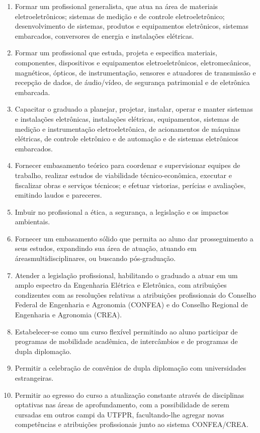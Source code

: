 \begin{enumerate}
	\item	Formar um profissional generalista, que atua na área de materiais eletroeletrônicos; sistemas de medição e de controle eletroeletrônico; desenvolvimento de sistemas, produtos e equipamentos eletrônicos, sistemas embarcados, conversores de energia e instalações elétricas.
	\item	Formar um profissional que estuda, projeta e especifica materiais, componentes, dispositivos e equipamentos eletroeletrônicos, eletromecânicos, magnéticos, ópticos, de instrumentação, sensores e atuadores de transmissão e recepção de dados, de áudio/vídeo, de segurança patrimonial e de eletrônica embarcada.
	\item	Capacitar o graduado a planejar, projetar, instalar, operar e manter sistemas e instalações eletrônicas, instalações elétricas, equipamentos, sistemas de medição e instrumentação eletroeletrônica, de acionamentos de máquinas elétricas, de controle eletrônico e de automação e de sistemas eletrônicos embarcados.
	\item	Fornecer embasamento teórico para coordenar e supervisionar equipes de trabalho, realizar estudos de viabilidade técnico-econômica, executar e fiscalizar obras e serviços técnicos; e efetuar vistorias, perícias e avaliações, emitindo laudos e pareceres.
	\item	Imbuir no profissional a ética, a segurança, a legislação e os impactos ambientais.
	\item	Fornecer um embasamento sólido que permita ao aluno dar prosseguimento a seus estudos, expandindo sua área de atuação, atuando em áreasmultidisciplinares, ou buscando pós-graduação.
	\item	Atender a legislação profissional, habilitando o graduado a atuar em um amplo espectro da Engenharia Elétrica e Eletrônica, com atribuições condizentes com as resoluções relativas a atribuições profissionais do Conselho Federal de Engenharia e Agronomia (CONFEA) e do Conselho Regional de Engenharia e Agronomia (CREA).
	\item	Estabelecer-se como um curso flexível permitindo ao aluno participar de programas de mobilidade acadêmica, de intercâmbios e de programas de dupla diplomação.
	\item	Permitir a celebração de convênios de dupla diplomação com universidades estrangeiras.
	\item	Permitir ao egresso do curso a atualização constante através de disciplinas optativas nas áreas de aprofundamento, com a possibilidade de serem cursadas em outros campi da UTFPR, facultando-lhe agregar novas competências e atribuições profissionais junto ao sistema CONFEA/CREA.
\end{enumerate}

